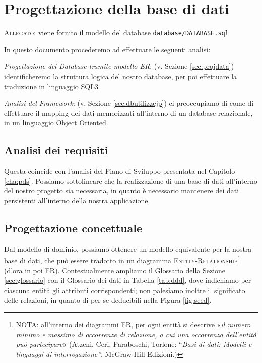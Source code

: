 \chapter{Progettazione della base di dati}\label{cha:progdbasdata}
\minitoc\mtcskip

\textsc{Allegato}: viene fornito il modello del database \texttt{database/DATABASE.sql}

In questo documento procederemo ad effettuare le seguenti analisi:
\begin{itemize}
\diam \textit{Progettazione del Database tramite modello ER}: (v. Sezione 
	\vref{sec:projdata}) identificheremo la struttura logica del nostro 
	database, per poi effettuare la traduzione in linguaggio SQL3
	
\diam \textit{Analisi del Framework}: (v. Sezione \vref{sec:dbutilizzejp}) ci preoccupiamo 
	di come di effettuare il mapping dei dati memorizzati all'interno di un 
	database relazionale, in un linguaggio Object Oriented.
\end{itemize}

\section{Analisi dei requisiti}\label{sec:projdata}
Questa coincide con l'analisi del Piano di Sviluppo presentata nel Capitolo
\vref{cha:pds}. Possiamo sottolineare che la realizzazione di una base di 
dati all'interno del nostro progetto sia necessaria, in quanto è necessario 
mantenere dei dati persistenti all'interno della nostra applicazione.

\section{Progettazione concettuale}
Dal modello di dominio, possiamo ottenere un modello equivalente per la nostra
base di dati, che può essere tradotto in un diagramma \textsc{Entity-Relationship}\footnote{
NOTA: all'interno dei diagrammi ER, per ogni entità si descrive «\textit{il numero
minimo e massimo di occorrenze di relazione, a cui una occorrenza dell'entità 
può partecipare}» (Atzeni, Ceri, Paraboschi, Torlone: ``\textit{Basi di dati: Modelli
e linguaggi di interrogazione''}. McGraw-Hill Edizioni.)} (d'ora in poi ER).
Contestualmente ampliamo il Glossario della Sezione \vref{sec:glossario} con 
il Glossario dei dati in Tabella \vref{tab:ddd}, dove indichiamo per ciascuna 
entità gli attributi corrispondenti; non palesiamo inoltre il significato 
delle relazioni, in quanto di per se deducibili nella Figura \vref{fig:seed}.

